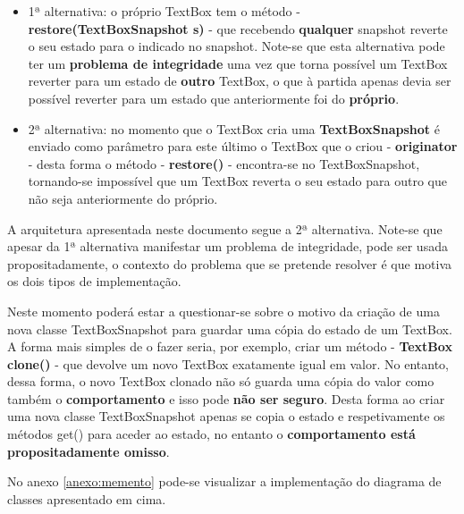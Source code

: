 \begin{itemize}
    
    \item 1ª alternativa: o próprio TextBox tem o método - \textbf{restore(TextBoxSnapshot s)} - que recebendo \textbf{qualquer} snapshot reverte o seu estado para o indicado no snapshot.
    Note-se que esta alternativa pode ter um \textbf{problema de integridade} uma vez que torna possível um TextBox reverter para um estado de \textbf{outro} TextBox, o que à partida apenas devia ser possível reverter para um estado que anteriormente foi do \textbf{próprio}. 
    \newline
    
    \item 2ª alternativa: no momento que o TextBox cria uma \textbf{TextBoxSnapshot} é enviado como parâmetro para este último o TextBox que o criou - \textbf{originator} - desta forma o método - \textbf{restore()} - encontra-se no TextBoxSnapshot, tornando-se impossível que um TextBox reverta o seu estado para outro que não seja anteriormente do próprio.
    \newline
    
\end{itemize}

\hspace{2mm} A arquitetura apresentada neste documento segue a 2ª alternativa. Note-se que apesar da 1ª alternativa manifestar um problema de integridade, pode ser usada propositadamente, o contexto do problema que se pretende resolver é que motiva os dois tipos de implementação.

\hspace{2mm} Neste momento poderá estar a questionar-se sobre o motivo da criação de uma nova classe TextBoxSnapshot para guardar uma cópia do estado de um TextBox. A forma mais simples de o fazer seria, por exemplo, criar um método - \textbf{TextBox clone()} - que devolve um novo TextBox exatamente igual em valor. No entanto, dessa forma, o novo TextBox clonado não só guarda uma cópia do valor como também o \textbf{comportamento} e isso pode \textbf{não ser seguro}. Desta forma ao criar uma nova classe TextBoxSnapshot apenas se copia o estado e respetivamente os métodos get() para aceder ao estado, no entanto o \textbf{comportamento está propositadamente omisso}.

\hspace{2mm} No anexo \ref{anexo:memento} pode-se visualizar a implementação do diagrama de classes apresentado em cima. 